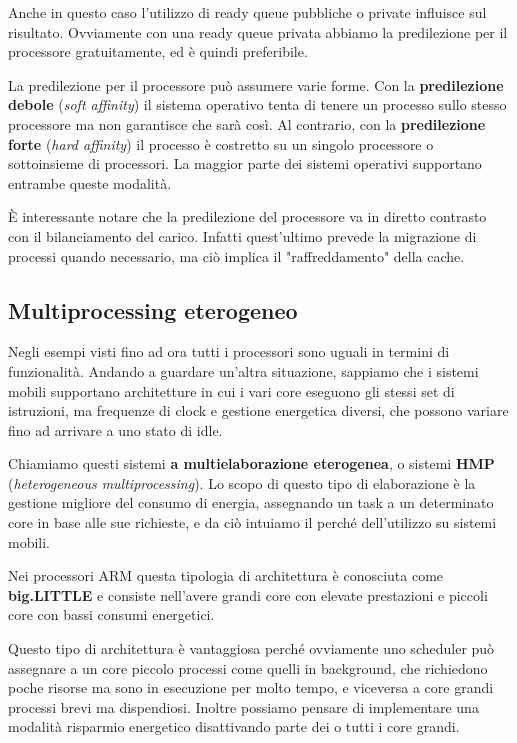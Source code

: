         Anche in questo caso l'utilizzo di ready queue pubbliche o private influisce sul risultato. Ovviamente con una ready queue privata abbiamo la predilezione per il processore gratuitamente, ed è quindi preferibile.
            
        La predilezione per il processore può assumere varie forme. Con la \textbf{predilezione debole} (\textit{soft affinity}) il sistema operativo tenta di tenere un processo sullo stesso processore ma non garantisce che sarà così. Al contrario, con la \textbf{predilezione forte} (\textit{hard affinity}) il processo è costretto su un singolo processore o sottoinsieme di processori. La maggior parte dei sistemi operativi supportano entrambe queste modalità.
            
        È interessante notare che la predilezione del processore va in diretto contrasto con il bilanciamento del carico. Infatti quest'ultimo prevede la migrazione di processi quando necessario, ma ciò implica il "raffreddamento" della cache.
            
    \subsection{Multiprocessing eterogeneo}
        Negli esempi visti fino ad ora tutti i processori sono uguali in termini di funzionalità. Andando a guardare un'altra situazione, sappiamo che i sistemi mobili supportano architetture in cui i vari core eseguono gli stessi set di istruzioni, ma frequenze di clock e gestione energetica diversi, che possono variare fino ad arrivare a uno stato di idle.
            
        Chiamiamo questi sistemi \textbf{a multielaborazione eterogenea}, o sistemi \textbf{HMP} (\textit{heterogeneous multiprocessing}). Lo scopo di questo tipo di elaborazione è la gestione migliore del consumo di energia, assegnando un task a un determinato core in base alle sue richieste, e da ciò intuiamo il perché dell'utilizzo su sistemi mobili.
            
        Nei processori ARM questa tipologia di architettura è conosciuta come \textbf{big.LITTLE} e consiste nell'avere grandi core con elevate prestazioni e piccoli core con bassi consumi energetici.
            
        Questo tipo di architettura è vantaggiosa perché ovviamente uno scheduler può assegnare a un core piccolo processi come quelli in background, che richiedono poche risorse ma sono in esecuzione per molto tempo, e viceversa a core grandi processi brevi ma dispendiosi. Inoltre possiamo pensare di implementare una modalità risparmio energetico disattivando parte dei o tutti i core grandi.
            
